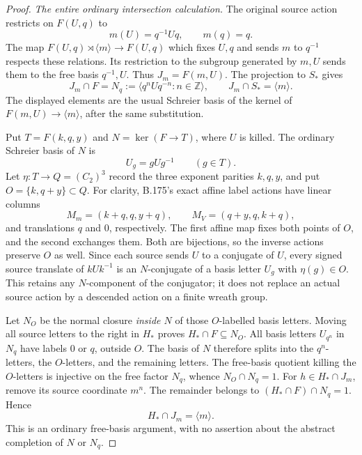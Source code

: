 \begin{proof}
\emph{The entire ordinary intersection calculation.}
The original source action restricts on \(F(U,q)\) to
\[
 m(U)=q^{-1}Uq,\qquad m(q)=q.
\]
The map \(F(U,q)\rtimes\langle m\rangle\to F(U,q)\)
which fixes \(U,q\) and sends \(m\) to \(q^{-1}\) respects these
relations. Its restriction to the subgroup generated by \(m,U\)
sends them to the free basis \(q^{-1},U\). Thus \(J_m=F(m,U)\).
The projection to \(S_*\) gives
\begin{equation}\label{eq:B177-Nq}
 J_m\cap F=N_q
   :=\langle q^nUq^{-n}:n\in\mathbb Z\rangle,
 \qquad J_m\cap S_*=\langle m\rangle.
\end{equation}
The displayed elements are the usual Schreier basis of the kernel
of \(F(m,U)\to\langle m\rangle\), after the same substitution.

Put \(T=F(k,q,y)\) and \(N=\ker(F\to T)\), where \(U\) is
killed. The ordinary Schreier basis of \(N\) is
\[
                 U_g=gUg^{-1}\qquad(g\in T).
\]
Let \(\eta:T\to Q=(C_2)^3\) record the three exponent parities
\(k,q,y\), and put \(O=\{k,q+y\}\subset Q\).
For clarity, B.175's exact affine label actions have linear columns
\[
 M_m=(k+q,q,y+q),\qquad M_V=(q+y,q,k+q),
\]
and translations \(q\) and \(0\), respectively. The first affine
map fixes both points of \(O\), and the second exchanges them.
Both are bijections, so the inverse actions preserve \(O\) as well.
Since each source sends \(U\) to a conjugate of \(U\), every signed
source translate of \(kUk^{-1}\) is an \(N\)-conjugate of a basis
letter \(U_g\) with \(\eta(g)\in O\). This retains any
\(N\)-component of the conjugator; it does not replace an actual
source action by a descended action on a finite wreath group.

Let \(N_O\) be the normal closure \emph{inside \(N\)} of those
\(O\)-labelled basis letters. Moving all source letters to the right
in \(H_*\) proves \(H_*\cap F\subseteq N_O\).
All basis letters \(U_{q^n}\) in \(N_q\) have labels \(0\) or
\(q\), outside \(O\). The basis of \(N\) therefore splits into
the \(q^n\)-letters, the \(O\)-letters, and the remaining letters.
The free-basis quotient killing the \(O\)-letters is injective on
the free factor \(N_q\), whence \(N_O\cap N_q=1\).
For \(h\in H_*\cap J_m\), remove its source coordinate \(m^n\).
The remainder belongs to \((H_*\cap F)\cap N_q=1\). Hence
\begin{equation}\label{eq:B177-HJm}
                       H_*\cap J_m=\langle m\rangle.
\end{equation}
This is an ordinary free-basis argument, with no assertion about the
abstract completion of \(N\) or \(N_q\).


\end{proof}
